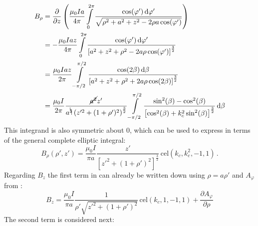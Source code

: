 \begin{align}
  B_\rho &= \frac{\partial}{\partial z} \left(
             \frac{\mu_0 I a}{4 \pi}
             \int\limits_{0}^{2 \pi}
               \frac{\cos(\varphi') \,\mathrm{d} \varphi'}{\sqrt{ \rho^2 + a^2 + z^2 - 2 \rho a \cos(\varphi')}} \right) \nonumber \\
    ~    &= - \frac{\mu_0 I a z}{4 \pi}
              \int\limits_{0}^{2 \pi}
                \frac{\cos(\varphi') \,\mathrm{d} \varphi'}
                     {\left[a^2 + z^2 + \rho^2 - 2 a \rho \cos(\varphi') \right]^{\frac{3}{2}}} \nonumber \\
    ~    &=   \frac{\mu_0 I a z}{2 \pi}
              \int\limits_{-\pi/2}^{\pi/2}
                \frac{\cos(2 \beta) \,\mathrm{d}\beta}
                     {\left[a^2 + z^2 + \rho^2 + 2 a \rho \cos(2 \beta) \right]^{\frac{3}{2}}} \nonumber \\
     ~    &=  \frac{\mu_0 I}{2 \pi}
              \frac{\cancel{a^2} z'}{a^{\bcancel{3}} \left( z'^2 + (1 + \rho')^2 \right)^{\frac{3}{2}}}
              \int\limits_{-\pi/2}^{\pi/2}
                \frac{\sin^2(\beta) - \cos^2(\beta)}
                     { \left[\cos^2(\beta) + k_c^2 \sin^2(\beta) \right]^{\frac{3}{2}} }
                \,\mathrm{d}\beta \label{eqn:B_rho_almost}
\end{align}
This integrand is also symmetric about $0$, which can be used to express  in terms of the general complete elliptic integral:
\begin{equation}
  \boxed{B_\rho(\rho', z') =
    \frac{\mu_0 I}{\pi a}
    \frac{z'}{\left[ z'^2 + (1 + \rho')^2 \right]^{\frac{3}{2}}}
    \,\mathrm{cel}(k_c, k_c^2, -1, 1) } \, . \label{eqn:B_rho_final}
\end{equation}
Regarding $B_z$ the first term in  can already be written down using $\rho = a \rho'$ and $A_\varphi$ from :
\begin{equation}
  B_z = \frac{\mu_0 I}{\pi a}
        \frac{1}{\rho' \sqrt{z'^2 + (1 + \rho')^2}}
        \,\mathrm{cel}(k_c, 1, -1, 1)
        + \frac{\partial A_\varphi}{\partial \rho} \label{eqn:B_z_intermediate}
\end{equation}
The second term is considered next:
